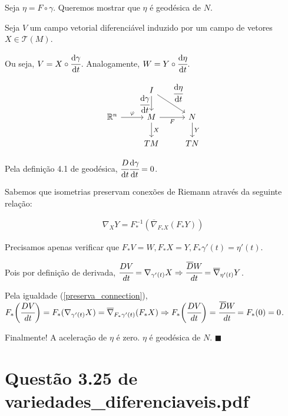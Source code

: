 \documentclass[10pt,a4paper]{article}
\begin{document}
		Seja $\eta = F \circ \gamma$. Queremos mostrar que $\eta$ \'e geod\'esica de $N$.

		Seja $V$ um campo vetorial diferenci\'avel induzido por um campo de vetores $X \in \mathcal{T}(M)$.

		Ou seja, $V = X \circ \cfrac{\mathrm{d} \gamma}{\mathrm{d} t}$. Analogamente, $W = Y \circ \cfrac{\mathrm{d} \eta}{\mathrm{d} t}$.

		\[
		\begin{tikzcd}
		& I \arrow[swap]{d}{\cfrac{\mathrm{d} \gamma}{\mathrm{d} t}} \arrow{rd}{\cfrac{\mathrm{d} \eta}{\mathrm{d} t}} &  \\
		\mathbb{R}^n \arrow{r}{\varphi} & M \arrow{d}{X} \arrow[swap]{r}{F} & N \arrow{d}{Y} \\
		                                                    & TM & TN
		\end{tikzcd}
		\]

		Pela defini\c{c}\~ao 4.1 de geod\'esica, $\cfrac{D}{\mathrm{d} t} \cfrac{\mathrm{d} \gamma}{\mathrm{d} t} = 0$.

		\vspace{3mm}

		Sabemos que isometrias preservam conex\~oes de Riemann atrav\'es da seguinte rela\c{c}\~ao:

		\begin{align}
		  \nabla_X Y = F_*^{-1} ( \overline{\nabla}_{F_* X} (F_* Y) ) \label{preserva_connection}
		\end{align}

		Precisamos apenas verificar que $F_* V = W, F_* X = Y, F_* \gamma'(t) = \eta'(t)$.

		Pois por defini\c{c}\~ao de derivada, $\cfrac{DV}{dt} = \nabla_{\gamma'(t)} X \Rightarrow \cfrac{\overline{D}W}{dt} = \overline{\nabla}_{\eta'(t)} Y$.

		Pela igualdade (\ref{preserva_connection}), $F_* \bigg(\cfrac{DV}{dt} \bigg) = F_* (\nabla_{\gamma'(t)} X) = \overline{\nabla}_{F_* \gamma'(t)} (F_* X) \Rightarrow F_* \bigg(\cfrac{DV}{dt} \bigg) = \cfrac{\overline{D}W}{dt} = F_* (0) = 0$.

		Finalmente! A acelera\c{c}\~ao de $\eta$ \'e zero. $\eta$ \'e geod\'esica de $N.\,\,\blacksquare$

	\section{Quest\~ao 3.25 de variedades\_diferenciaveis.pdf}
		\begin{flushright}
		\end{flushright}
\end{document}
